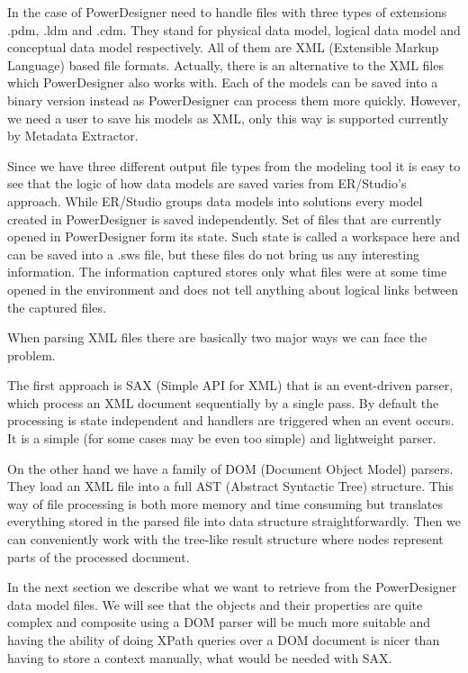 In the case of PowerDesigner need to handle files with three types of extensions .pdm, .ldm and .cdm. They  stand for physical data model, logical data model and conceptual data model respectively.
All of them are XML (Extensible Markup Language) based file formats.
Actually, there is an alternative to the XML files which PowerDesigner also works with. Each of the models can be saved into a binary version instead as PowerDesigner can process them more quickly. However, we need a user to save his models as XML, only this way is supported currently by Metadata Extractor.

Since we have three different output file types from the modeling tool it is easy to see that the logic of how data models are saved varies from ER/Studio's approach. 
While ER/Studio groups data models into solutions every model created in PowerDesigner is saved independently. Set of files that are currently opened in PowerDesigner form its state. Such state is called a workspace here and can be saved into a .sws file, but these files do not bring us any interesting information. The information captured stores only what files were at some time opened in the environment and does not tell anything about logical links between the captured files.

When parsing XML files there are basically two major ways we can face the problem.

The first approach is SAX (Simple API for XML) that is an event-driven parser, which process an XML document sequentially by a single pass. By default the processing is state independent and handlers are triggered when an event occurs. It is a simple (for some cases may be even too simple) and lightweight parser.

On the other hand we have a family of DOM (Document Object Model) parsers. They load an XML file into a full AST (Abstract Syntactic Tree) structure. This way of file processing is both more memory and time consuming but translates everything stored in the parsed file into data structure straightforwardly. Then we can conveniently work with the tree-like result structure where nodes represent parts of the processed document.

In the next section we describe what we want to retrieve from the PowerDesigner data model files. We will see that the objects and their properties are quite complex and composite using a DOM parser will be much more suitable and having the ability of doing XPath queries over a DOM document is nicer than having to store a context manually, what would be needed with SAX.

